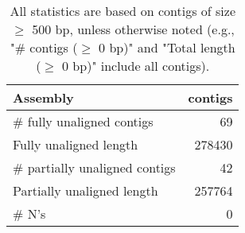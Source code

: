 \documentclass[12pt,a4paper]{article}
\begin{document}
\begin{table}[ht]
\begin{center}
\caption{All statistics are based on contigs of size $\geq$ 500 bp, unless otherwise noted (e.g., "\# contigs ($\geq$ 0 bp)" and "Total length ($\geq$ 0 bp)" include all contigs).}
\begin{tabular}{|l*{1}{|r}|}
\hline
Assembly & contigs \\ \hline
\# fully unaligned contigs & 69 \\ \hline
Fully unaligned length & 278430 \\ \hline
\# partially unaligned contigs & 42 \\ \hline
Partially unaligned length & 257764 \\ \hline
\# N's & 0 \\ \hline
\end{tabular}
\end{center}
\end{table}
\end{document}
